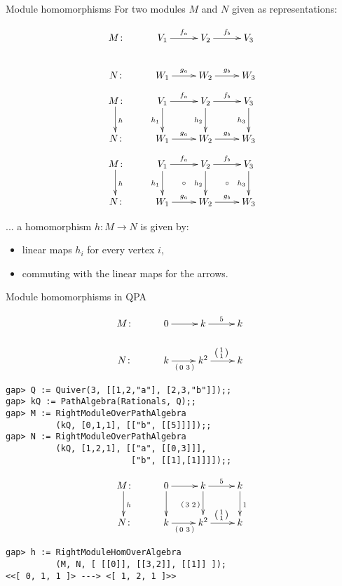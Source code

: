\documentclass[usenames,dvipsnames]{beamer}
\newcommand{\vv}[2]{\left( \begin{smallmatrix} #1 & #2 \end{smallmatrix} \right)}
\begin{document}

\begin{frame}{Module homomorphisms}
For two modules $M$ and $N$ given as representations:
\begin{overprint}
\[
\xymatrix{
M \colon &
V_1 \ar[r]^{f_a} &
V_2 \ar[r]^{f_b} &
V_3
\\
N \colon &
W_1 \ar[r]^{g_a} &
W_2 \ar[r]^{g_b} &
W_3
}
\]
\[
\xymatrix{
M \colon \ar@<-.2em>[d]^{h} &
V_1 \ar[r]^{f_a} \ar[d]_{h_1} &
V_2 \ar[r]^{f_b} \ar[d]_{h_2} &
V_3              \ar[d]_{h_3}
\\
N \colon &
W_1 \ar[r]^{g_a} &
W_2 \ar[r]^{g_b} &
W_3
}
\]
\[
\xymatrix{
M \colon \ar@<-.2em>[d]^{h} &
V_1 \ar[r]^{f_a} \ar[d]_{h_1} \ar@{}[dr]|{\circ} &
V_2 \ar[r]^{f_b} \ar[d]_{h_2} \ar@{}[dr]|{\circ} &
V_3              \ar[d]_{h_3}
\\
N \colon &
W_1 \ar[r]^{g_a} &
W_2 \ar[r]^{g_b} &
W_3
}
\]
\end{overprint}
\vspace{1em}

... a homomorphism $h \colon M \to N$ is given by:
\begin{itemize}
\item linear maps $h_i$ for every vertex $i$,
\item commuting with the linear maps for the arrows.
\end{itemize}
\end{frame}

\begin{frame}[fragile]{Module homomorphisms in QPA}
\begin{overprint}
\[
\xymatrix{
M \colon &
0 \ar[r]     &
k \ar[r]^{5} &
k \ar@{}[d]^{\phantom{1}}
\\
N \colon &
k   \ar[r]_{\vv{0}{3}} &
k^2 \ar[r]^{\left( \begin{smallmatrix} 1 \\ 1 \end{smallmatrix} \right)} &
k
}
\]
\begin{verbatim}
gap> Q := Quiver(3, [[1,2,"a"], [2,3,"b"]]);;
gap> kQ := PathAlgebra(Rationals, Q);;
gap> M := RightModuleOverPathAlgebra
          (kQ, [0,1,1], [["b", [[5]]]]);;
gap> N := RightModuleOverPathAlgebra
          (kQ, [1,2,1], [["a", [[0,3]]],
                         ["b", [[1],[1]]]]);;
\end{verbatim}
\[
\xymatrix{
M \colon \ar@<-.2em>[d]^{h} &
0 \ar[r]     \ar[d] &
k \ar[r]^{5} \ar[d]_{\vv{3}{2}} &
k            \ar[d]^{1}
\\
N \colon &
k   \ar[r]_{\vv{0}{3}} &
k^2 \ar[r]^{\left( \begin{smallmatrix} 1 \\ 1 \end{smallmatrix} \right)} &
k
}
\]
\begin{verbatim}
gap> h := RightModuleHomOverAlgebra
          (M, N, [ [[0]], [[3,2]], [[1]] ]);
<<[ 0, 1, 1 ]> ---> <[ 1, 2, 1 ]>>
\end{verbatim}
\end{overprint}
\end{frame}
\end{document}
